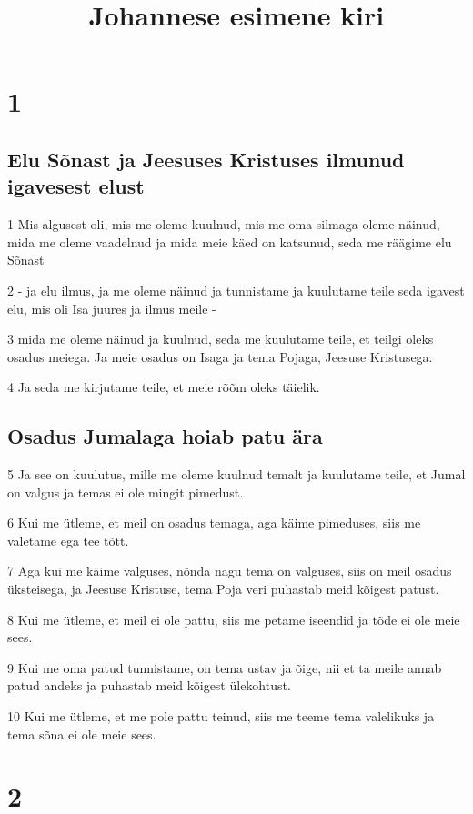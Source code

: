 

\title{Johannese esimene kiri}

\chapter{1}

\section*{Elu Sõnast ja Jeesuses Kristuses ilmunud igavesest elust}

\par 1 Mis algusest oli, mis me oleme kuulnud, mis me oma silmaga oleme näinud, mida me oleme vaadelnud ja mida meie käed on katsunud, seda me räägime elu Sõnast
\par 2 - ja elu ilmus, ja me oleme näinud ja tunnistame ja kuulutame teile seda igavest elu, mis oli Isa juures ja ilmus meile -
\par 3 mida me oleme näinud ja kuulnud, seda me kuulutame teile, et teilgi oleks osadus meiega. Ja meie osadus on Isaga ja tema Pojaga, Jeesuse Kristusega.
\par 4 Ja seda me kirjutame teile, et meie rõõm oleks täielik.

\section*{Osadus Jumalaga hoiab patu ära}

\par 5 Ja see on kuulutus, mille me oleme kuulnud temalt ja kuulutame teile, et Jumal on valgus ja temas ei ole mingit pimedust.
\par 6 Kui me ütleme, et meil on osadus temaga, aga käime pimeduses, siis me valetame ega tee tõtt.
\par 7 Aga kui me käime valguses, nõnda nagu tema on valguses, siis on meil osadus üksteisega, ja Jeesuse Kristuse, tema Poja veri puhastab meid kõigest patust.
\par 8 Kui me ütleme, et meil ei ole pattu, siis me petame iseendid ja tõde ei ole meie sees.
\par 9 Kui me oma patud tunnistame, on tema ustav ja õige, nii et ta meile annab patud andeks ja puhastab meid kõigest ülekohtust.
\par 10 Kui me ütleme, et me pole pattu teinud, siis me teeme tema valelikuks ja tema sõna ei ole meie sees.


\chapter{2}

